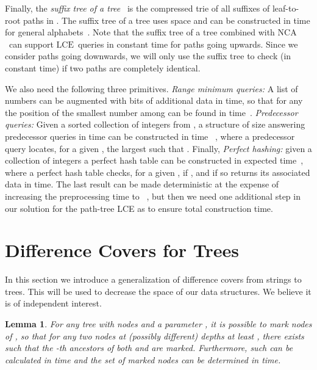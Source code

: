 \documentclass [10pt]{article}
\newtheorem{lemma}{Lemma}
\newcommand{\NCA}{\ensuremath{\mathrm{NCA}}}
\newcommand{\LCE}{\ensuremath{\mathrm{LCE}}}
\begin{document}
Finally, the \emph{suffix tree of a tree}~\cite{Kosaraju1989, Breslauer1998, shibuya1999} is the compressed trie of all suffixes of leaf-to-root paths in . The suffix tree of a tree uses  space and  can be constructed  in  time for general alphabets~\cite{shibuya1999}. Note that the suffix tree of a tree combined with \NCA\ can support \LCE\ queries in constant time for paths going upwards. Since we consider paths going downwards, we will only use the suffix tree to check (in constant time) if two paths are completely identical.

We also need the following three primitives. {\em Range minimum queries:} A list of  numbers  can be augmented with  bits of additional
data in  time, so that for any  the position of the smallest number among  can be found in 
time~\cite{FH2011}.  {\em Predecessor queries:} Given a sorted collection of  integers from , a structure of size  answering predecessor queries in
 time can be constructed in time ~\cite{BKZ1977}, where a predecessor query locates, for a given , the largest 
such that . Finally,  {\em Perfect hashing:}  given a collection  of  integers a perfect hash table can be constructed in expected  time~\cite{FKS},
where a perfect hash table checks, for a given , if , and if so returns its associated data in  time. The last result can be
made deterministic at the expense of increasing the preprocessing time to ~\cite{Ruzic2004}, but then we need one additional step
in our solution for the path-tree LCE as to ensure  total construction time.

\section{Difference Covers for Trees}
In this section we introduce a generalization of difference covers from strings to trees. This will be used to decrease the space of our data structures. We believe it is of independent interest.

\begin{lemma}\label{lem:difference}
For any tree  with  nodes and a parameter , it is possible to mark  nodes of , so that for any two nodes 
at (possibly different) depths at least , there exists  such that the -th ancestors of both  and 
are marked. Furthermore, such  can be calculated in  time and the set of marked nodes can be determined in  time.
\end{lemma}
\end{document}
